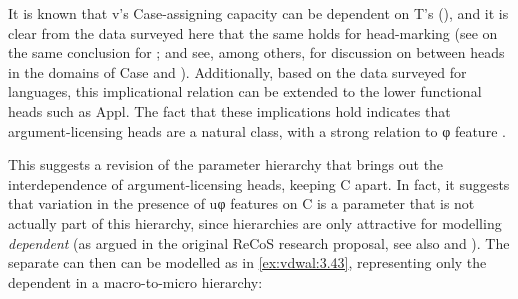 \documentclass[output=paper]{langsci/langscibook}
\begin{document}
It is known that v’s Case-assigning capacity can be dependent on T’s
(\citealt{Marantz1991,Baker2015}), and it is clear from the data surveyed here
that the same holds for head-marking  (see \citealt{Roberts2014} on
the same conclusion for ; and see, among others,
\citealt{Bobaljik2008,Barany2015} for discussion on 
between heads in the domains of Case and
).
Additionally, based on the data surveyed for  languages, this
implicational relation can be extended to the lower
functional heads such as Appl. The fact that these implications hold indicates
that argument-licensing heads are a natural class, with a strong relation to φ
feature .

This suggests a revision of the parameter hierarchy that brings out the
interdependence of argument-licensing heads, keeping C apart. In fact, it
suggests that variation in the presence of uφ features on C is a parameter that
is not actually part of this hierarchy, since hierarchies are only attractive
for modelling \emph{dependent}  (as argued in the original ReCoS
research proposal, see also \citealt{RobHol2010} and \citealt{Sheehan2014}).
The separate  can then can be modelled as in \eqref{ex:vdwal:3.43},
representing only the dependent  in a macro-to-micro
hierarchy:%
\end{document}
